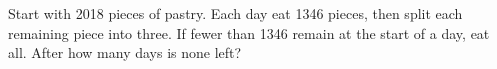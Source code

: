 Start with 2018 pieces of pastry. Each day eat 1346 pieces, then split each remaining piece into three. If fewer than 1346 remain at the start of a day, eat all. After how many days is none left?
